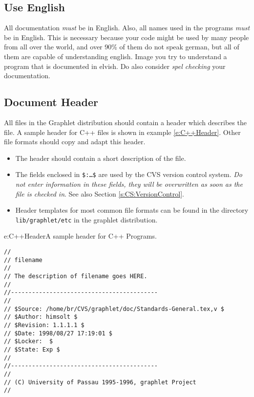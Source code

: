 \subsection{Use English}

All documentation \emph{must} be in English.  Also,
all names used in the programs \emph{must} be in English.  This
is necessary because your code might be used by many people from
all over the world, and over 90\% of them do not speak german,
but all of them are capable of understanding english.  Image you
try to understand a program that is documented in elvish.  Do
also consider \emph{spel checking} your documentation.

\subsection{Document Header}
\label{ss:CS:Headers}

 All files in the Graphlet distribution should
contain a header which describes the file.  A sample header for
C++ files is shown in example \ref{e:C++Header}. Other file
formats should copy and adapt this header.

\begin{itemize}
  
  \item The header should contain a short description of the
  file.
  
  \item The fields enclosed in
  \mbox{\texttt{\$:\textnormal{\ldots}\$}} are used by
  the CVS version control system. \emph{Do not enter information
    in these fields, they will be overwritten as soon as the file
    is checked in}.  See also Section \ref{s:CS:VersionControl}.
        
  \item Header templates for most common file formats can be
  found in the directory \texttt{lib/graphlet/etc} in the
  graphlet distribution.

\end{itemize}

\begin{example}{e:C++Header}{A sample header for C++ Programs.}
\begin{small}
\begin{verbatim}
//
// filename
//
// The description of filename goes HERE.
//
//------------------------------------------
//
// $Source: /home/br/CVS/graphlet/doc/Standards-General.tex,v $
// $Author: himsolt $
// $Revision: 1.1.1.1 $
// $Date: 1998/08/27 17:19:01 $
// $Locker:  $
// $State: Exp $
//
//------------------------------------------
//
// (C) University of Passau 1995-1996, graphlet Project
//
\end{verbatim}
\end{small}
\end{example}


